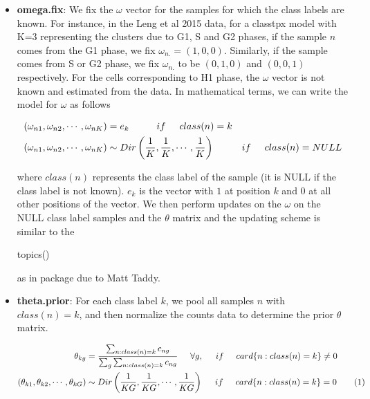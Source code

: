 \documentclass[12pt]{article}
\newcommand\numberthis{\addtocounter{equation}{1}\tag{\theequation}}
\begin{document}
\begin{itemize}

\item \textbf{omega.fix}: We fix the $\omega$ vector for the samples for which the class labels are known. For instance, in the Leng et al 2015 data, for a classtpx model with K=3 representing the clusters due to G1, S and G2 phases, if the sample $n$ comes from the G1 phase, we fix $\omega_{n.} = (1,0,0)$. Similarly, if the sample comes from S or G2 phase, we fix $\omega_{n.}$ to be $(0,1,0)$ and $(0,0,1)$ respectively. For the cells corresponding to H1 phase, the $\omega$ vector is not known and estimated from the data. In mathematical terms, we can write the model for $\omega$ as follows 

\begin{align*}
\left(\omega_{n1}, \omega_{n2}, \cdots, \omega_{nK} \right) & = e_{k} \hspace{1 cm} if \hspace{0.5 cm} class(n) = k  \\
\left(\omega_{n1}, \omega_{n2}, \cdots, \omega_{nK} \right) & \sim Dir \left ( \frac{1}{K}, \frac{1}{K}, \cdots, \frac{1}{K} \right) \hspace{1 cm} if \hspace{0.5 cm} class(n) = NULL \\
\end{align*}

where $class(n)$ represents the class label of the sample (it is NULL if the class label is not known). $e_{k}$ is the vector with $1$ at position $k$ and $0$ at all other positions of the vector. We then perform updates on the $\omega$ on the NULL class label samples and the $\theta$ matrix and the updating scheme is similar to the \begin{verb} topics() \end{verb} as in  package due to Matt Taddy.

\item \textbf{theta.prior}: For each class label $k$, we pool all samples $n$ with $class(n)=k$, and then normalize the counts data to determine the prior $\theta$ matrix.

\begin{align*}
\theta_{kg} & = \frac{\sum_{n:class(n)=k} c_{ng}}{\sum_{g} \sum_{n:class(n)=k} c_{ng}} \hspace{0.5 cm} \forall g,  \hspace{0.5 cm} if \hspace{0.5 cm} card \{n: class(n)=k \} \neq 0 \nonumber \\
\left(\theta_{k1}, \theta_{k2}, \cdots, \theta_{kG} \right) & \sim Dir \left ( \frac{1}{KG}, \frac{1}{KG}, \cdots, \frac{1}{KG} \right) \hspace{0.5 cm} if \hspace{0.5 cm} card \{n: class(n)=k \}= 0  \numberthis \label{eq:eq1} \\
\end{align*}


\end{itemize}
\end{document}
